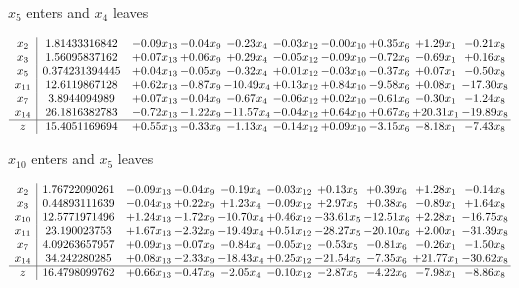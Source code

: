 \documentclass[9pt]{article}
\begin{document}
 $ x_{5} $ enters and $ x_{4} $ leaves 

 \[\begin{array}{c| c c@{\hskip 2pt} c@{\hskip 2pt} c@{\hskip 2pt} c@{\hskip 2pt} c@{\hskip 2pt} c@{\hskip 2pt} c@{\hskip 2pt} c@{\hskip 2pt} }
 x_{2}   &  1.81433316842 & -0.09 x_{13} & -0.04 x_{9} & -0.23 x_{4} & -0.03 x_{12} & -0.00 x_{10} & +  0.35 x_{6} & +  1.29 x_{1} & -0.21 x_{8}\\
 x_{3}   &  1.56095837162 & +  0.07 x_{13} & +  0.06 x_{9} & +  0.29 x_{4} & -0.05 x_{12} & -0.09 x_{10} & -0.72 x_{6} & -0.69 x_{1} & +  0.16 x_{8}\\
 x_{5}   &  0.374231394445 & +  0.04 x_{13} & -0.05 x_{9} & -0.32 x_{4} & +  0.01 x_{12} & -0.03 x_{10} & -0.37 x_{6} & +  0.07 x_{1} & -0.50 x_{8}\\
 x_{11}   &  12.6119867128 & +  0.62 x_{13} & -0.87 x_{9} & -10.49 x_{4} & +  0.13 x_{12} & +  0.84 x_{10} & -9.58 x_{6} & +  0.08 x_{1} & -17.30 x_{8}\\
 x_{7}   &  3.8944094989 & +  0.07 x_{13} & -0.04 x_{9} & -0.67 x_{4} & -0.06 x_{12} & +  0.02 x_{10} & -0.61 x_{6} & -0.30 x_{1} & -1.24 x_{8}\\
 x_{14}   &  26.1816382783 & -0.72 x_{13} & -1.22 x_{9} & -11.57 x_{4} & -0.04 x_{12} & +  0.64 x_{10} & +  0.67 x_{6} & + 20.31 x_{1} & -19.89 x_{8}\\
\hline
z    &  15.4051169694 & +  0.55 x_{13} & -0.33 x_{9} & -1.13 x_{4} & -0.14 x_{12} & +  0.09 x_{10} & -3.15 x_{6} & -8.18 x_{1} & -7.43 x_{8}\\
\end{array}\]


 $ x_{10} $ enters and $ x_{5} $ leaves 

 \[\begin{array}{c| c c@{\hskip 2pt} c@{\hskip 2pt} c@{\hskip 2pt} c@{\hskip 2pt} c@{\hskip 2pt} c@{\hskip 2pt} c@{\hskip 2pt} c@{\hskip 2pt} }
 x_{2}   &  1.76722090261 & -0.09 x_{13} & -0.04 x_{9} & -0.19 x_{4} & -0.03 x_{12} & +  0.13 x_{5} & +  0.39 x_{6} & +  1.28 x_{1} & -0.14 x_{8}\\
 x_{3}   &  0.44893111639 & -0.04 x_{13} & +  0.22 x_{9} & +  1.23 x_{4} & -0.09 x_{12} & +  2.97 x_{5} & +  0.38 x_{6} & -0.89 x_{1} & +  1.64 x_{8}\\
 x_{10}   &  12.5771971496 & +  1.24 x_{13} & -1.72 x_{9} & -10.70 x_{4} & +  0.46 x_{12} & -33.61 x_{5} & -12.51 x_{6} & +  2.28 x_{1} & -16.75 x_{8}\\
 x_{11}   &  23.190023753 & +  1.67 x_{13} & -2.32 x_{9} & -19.49 x_{4} & +  0.51 x_{12} & -28.27 x_{5} & -20.10 x_{6} & +  2.00 x_{1} & -31.39 x_{8}\\
 x_{7}   &  4.09263657957 & +  0.09 x_{13} & -0.07 x_{9} & -0.84 x_{4} & -0.05 x_{12} & -0.53 x_{5} & -0.81 x_{6} & -0.26 x_{1} & -1.50 x_{8}\\
 x_{14}   &  34.242280285 & +  0.08 x_{13} & -2.33 x_{9} & -18.43 x_{4} & +  0.25 x_{12} & -21.54 x_{5} & -7.35 x_{6} & + 21.77 x_{1} & -30.62 x_{8}\\
\hline
z    &  16.4798099762 & +  0.66 x_{13} & -0.47 x_{9} & -2.05 x_{4} & -0.10 x_{12} & -2.87 x_{5} & -4.22 x_{6} & -7.98 x_{1} & -8.86 x_{8}\\
\end{array}\]
\end{document}

